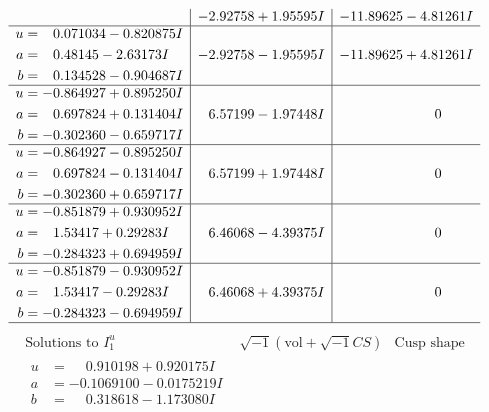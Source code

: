 \documentclass[1p]{elsarticle_modified}
\theoremstyle{definition}
\newcommand{\I}{\sqrt{-1}}
\begin{document}
$$\begin{array}{c|c|c}
 & -2.92758 + 1.95595 I & -11.89625 - 4.81261 I \\ \hline\begin{aligned}
u &= \phantom{-}0.071034 - 0.820875 I \\
a &= \phantom{-}0.48145 - 2.63173 I \\
b &= \phantom{-}0.134528 - 0.904687 I\end{aligned}
 & -2.92758 - 1.95595 I & -11.89625 + 4.81261 I \\ \hline\begin{aligned}
u &= -0.864927 + 0.895250 I \\
a &= \phantom{-}0.697824 + 0.131404 I \\
b &= -0.302360 - 0.659717 I\end{aligned}
 & \phantom{-}6.57199 - 1.97448 I & \phantom{-0.000000 } 0 \\ \hline\begin{aligned}
u &= -0.864927 - 0.895250 I \\
a &= \phantom{-}0.697824 - 0.131404 I \\
b &= -0.302360 + 0.659717 I\end{aligned}
 & \phantom{-}6.57199 + 1.97448 I & \phantom{-0.000000 } 0 \\ \hline\begin{aligned}
u &= -0.851879 + 0.930952 I \\
a &= \phantom{-}1.53417 + 0.29283 I \\
b &= -0.284323 + 0.694959 I\end{aligned}
 & \phantom{-}6.46068 - 4.39375 I & \phantom{-0.000000 } 0 \\ \hline\begin{aligned}
u &= -0.851879 - 0.930952 I \\
a &= \phantom{-}1.53417 - 0.29283 I \\
b &= -0.284323 - 0.694959 I\end{aligned}
 & \phantom{-}6.46068 + 4.39375 I & \phantom{-0.000000 } 0\\
 \hline 
 \end{array}$$\newpage$$\begin{array}{c|c|c}  
\text{Solutions to }I^u_{1}& \I (\text{vol} + \sqrt{-1}CS) & \text{Cusp shape}\\
 \hline 
\begin{aligned}
u &= \phantom{-}0.910198 + 0.920175 I \\
a &= -0.1069100 - 0.0175219 I \\
b &= \phantom{-}0.318618 - 1.173080 I\end{aligned}

\end{array}$$
\end{document}
